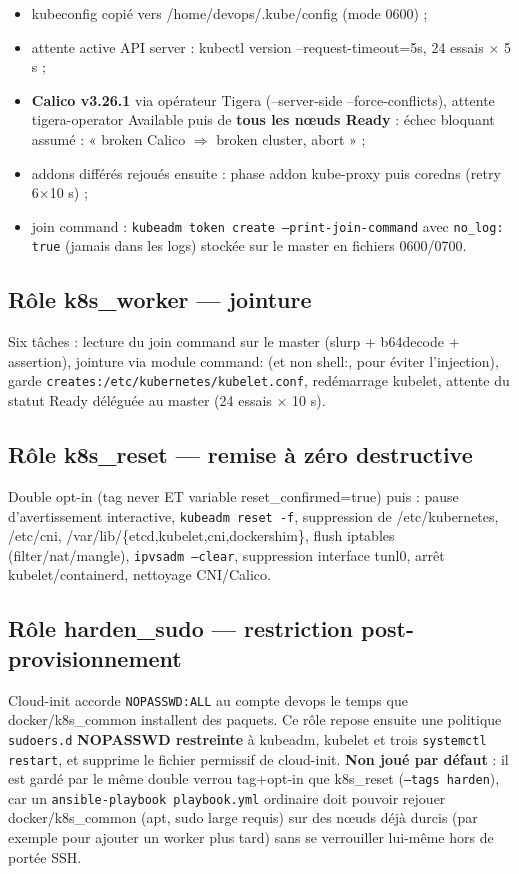 \documentclass[12pt,a4paper,twoside,openright]{report}
\begin{document}
\begin{itemize}[itemsep=1pt]
  \item kubeconfig copié vers /home/devops/.kube/config (mode 0600) ;
  \item attente active API server : kubectl version --request-timeout=5s, 24 essais × 5 s ;
  \item \textbf{Calico v3.26.1} via opérateur Tigera (--server-side --force-conflicts), attente tigera-operator Available puis de \textbf{tous les nœuds Ready} : échec bloquant assumé : « broken Calico $\Rightarrow$ broken cluster, abort » ;
  \item addons différés rejoués ensuite : phase addon kube-proxy puis coredns (retry 6×10 s) ;
  \item join command : \texttt{kubeadm token create --print-join-command} avec \texttt{no\_log: true} (jamais dans les logs) stockée sur le master en fichiers 0600/0700.
\end{itemize}

\subsection{Rôle k8s\_worker --- jointure}
Six tâches : lecture du join command sur le master (slurp + b64decode + assertion), jointure via module command: (et non shell:, pour éviter l'injection), garde \texttt{creates:/etc/kubernetes/kubelet.conf}, redémarrage kubelet, attente du statut Ready déléguée au master (24 essais × 10 s).

\subsection{Rôle k8s\_reset --- remise à zéro destructive}
Double opt-in (tag never ET variable reset\_confirmed=true) puis : pause d'avertissement interactive, \texttt{kubeadm reset -f}, suppression de /etc/kubernetes, /etc/cni, /var/lib/\{etcd,kubelet,cni,dockershim\}, flush iptables (filter/nat/mangle), \texttt{ipvsadm --clear}, suppression interface tunl0, arrêt kubelet/containerd, nettoyage CNI/Calico.

\subsection{Rôle harden\_sudo --- restriction post-provisionnement}
Cloud-init accorde \texttt{NOPASSWD:ALL} au compte devops le temps que docker/k8s\_common installent des paquets. Ce rôle repose ensuite une politique \texttt{sudoers.d} \textbf{NOPASSWD restreinte} à kubeadm, kubelet et trois \texttt{systemctl restart}, et supprime le fichier permissif de cloud-init. \textbf{Non joué par défaut} : il est gardé par le même double verrou tag+opt-in que k8s\_reset (\texttt{--tags harden}), car un \texttt{ansible-playbook playbook.yml} ordinaire doit pouvoir rejouer docker/k8s\_common (apt, sudo large requis) sur des nœuds déjà durcis (par exemple pour ajouter un worker plus tard) sans se verrouiller lui-même hors de portée SSH.
\end{document}
